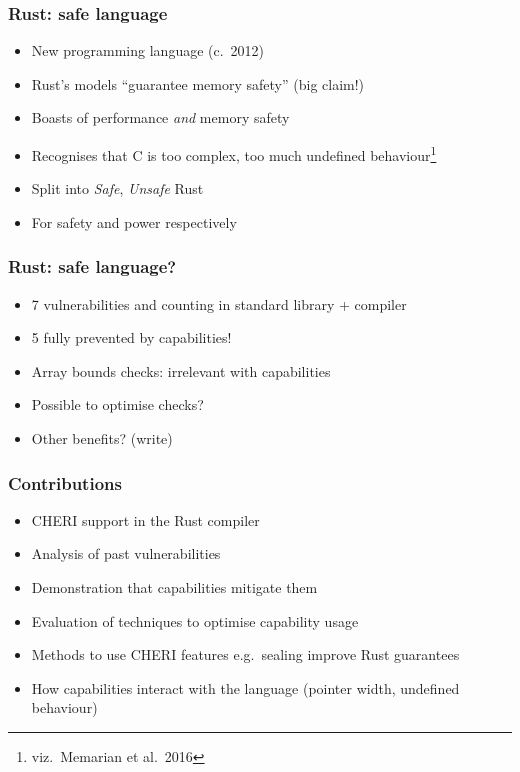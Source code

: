 \documentclass{beamer}
\begin{document}
\begin{frame}
\frametitle{Rust: safe language}

\begin{itemize}
    \item New programming language (c.\ 2012)
    \item Rust's models ``guarantee memory safety'' (big claim!)
    \item Boasts of performance \emph{and} memory safety
    \item Recognises that C is too complex, too much undefined behaviour\footnote{viz.\ Memarian et al.\ 2016}
    \item Split into \emph{Safe}, \emph{Unsafe} Rust
    \item For safety and power respectively
\end{itemize}
\end{frame}


\begin{frame}
\frametitle{Rust: safe language?}

\begin{itemize}
    \item 7 vulnerabilities and counting in standard library + compiler
    \item 5 fully prevented by capabilities!
    \item Array bounds checks: irrelevant with capabilities
    \item Possible to optimise checks?
    \item Other benefits? (write)
\end{itemize}
\end{frame}


\begin{frame}
\frametitle{Contributions}

\begin{itemize}
    \item CHERI support in the Rust compiler
    \item Analysis of past vulnerabilities
    \item Demonstration that capabilities mitigate them
    \item Evaluation of techniques to optimise capability usage
    \item Methods to use CHERI features e.g.\ sealing improve Rust guarantees
    \item How capabilities interact with the language (pointer width,
    undefined behaviour)
\end{itemize}
\end{frame}
\end{document}
